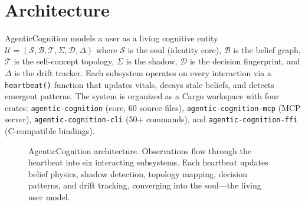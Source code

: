\documentclass[10pt, twocolumn]{article}
\begin{document}
\section{Architecture}
\label{sec:architecture}

AgenticCognition models a user as a living cognitive entity $\mathcal{U} = (\mathcal{S}, \mathcal{B}, \mathcal{T}, \Sigma, \mathcal{D}, \Delta)$ where $\mathcal{S}$ is the soul (identity core), $\mathcal{B}$ is the belief graph, $\mathcal{T}$ is the self-concept topology, $\Sigma$ is the shadow, $\mathcal{D}$ is the decision fingerprint, and $\Delta$ is the drift tracker. Each subsystem operates on every interaction via a \texttt{heartbeat()} function that updates vitals, decays stale beliefs, and detects emergent patterns. The system is organized as a Cargo workspace with four crates: \texttt{agentic-cognition} (core, 60 source files), \texttt{agentic-cognition-mcp} (MCP server), \texttt{agentic-cognition-cli} (50+ commands), and \texttt{agentic-cognition-ffi} (C-compatible bindings).

\begin{figure}[t]
\centering
{}
\caption{AgenticCognition architecture. Observations flow through the heartbeat into six interacting subsystems. Each heartbeat updates belief physics, shadow detection, topology mapping, decision patterns, and drift tracking, converging into the soul---the living user model.}
\label{fig:architecture}
\end{figure}
\end{document}
